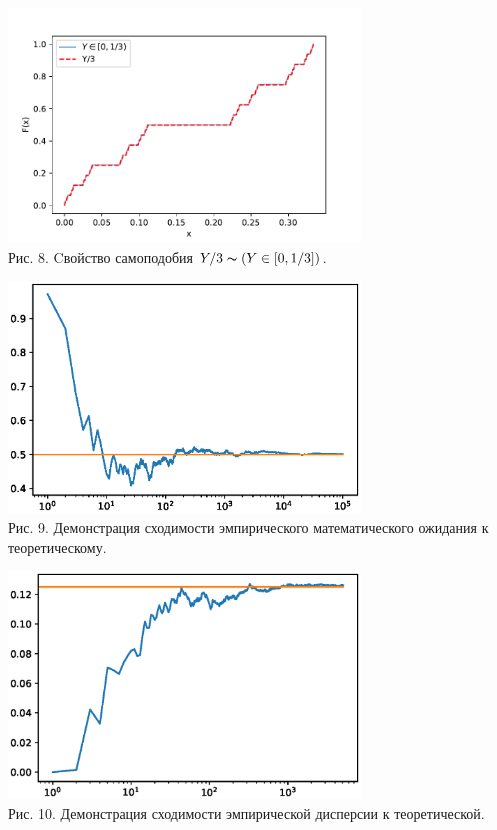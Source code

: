 \documentclass[11pt]{article}
\begin{document}
	\begin{center}
		\includegraphics[width=0.7\textwidth]{2_4.pdf}\\
		{Рис. 8. Cвойство самоподобия $Y/3 \thicksim (Y \in [0, 1/3])$. }
	\end{center}
	\begin{center}
		\includegraphics[width=0.7\textwidth]{2_5.eps}\\
		{Рис. 9. Демонстрация сходимости эмпирического математического ожидания к теоретическому.}
	\end{center}
	\begin{center}
		\includegraphics[width=0.7\textwidth]{2_6.eps}\\
		{Рис. 10.  Демонстрация сходимости эмпирической дисперсии к теоретической. }
	\end{center}
	\newpage
\end{document}
